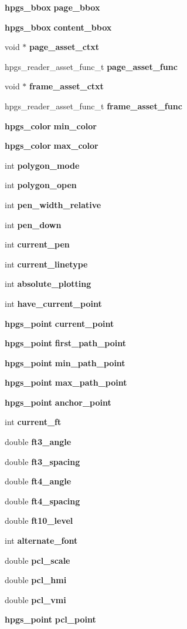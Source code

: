 \begin{CompactItemize}
{\bf hpgs\_\-bbox} {\bf page\_\-bbox}
\item 
{\bf hpgs\_\-bbox} {\bf content\_\-bbox}
\item 
void $\ast$ {\bf page\_\-asset\_\-ctxt}
\item 
hpgs\_\-reader\_\-asset\_\-func\_\-t {\bf page\_\-asset\_\-func}
\item 
void $\ast$ {\bf frame\_\-asset\_\-ctxt}
\item 
hpgs\_\-reader\_\-asset\_\-func\_\-t {\bf frame\_\-asset\_\-func}
\item 
{\bf hpgs\_\-color} {\bf min\_\-color}
\item 
{\bf hpgs\_\-color} {\bf max\_\-color}
\item 
int {\bf polygon\_\-mode}
\item 
int {\bf polygon\_\-open}
\item 
int {\bf pen\_\-width\_\-relative}
\item 
int {\bf pen\_\-down}
\item 
int {\bf current\_\-pen}
\item 
int {\bf current\_\-linetype}
\item 
int {\bf absolute\_\-plotting}
\item 
int {\bf have\_\-current\_\-point}
\item 
{\bf hpgs\_\-point} {\bf current\_\-point}
\item 
{\bf hpgs\_\-point} {\bf first\_\-path\_\-point}
\item 
{\bf hpgs\_\-point} {\bf min\_\-path\_\-point}
\item 
{\bf hpgs\_\-point} {\bf max\_\-path\_\-point}
\item 
{\bf hpgs\_\-point} {\bf anchor\_\-point}
\item 
int {\bf current\_\-ft}
\item 
double {\bf ft3\_\-angle}
\item 
double {\bf ft3\_\-spacing}
\item 
double {\bf ft4\_\-angle}
\item 
double {\bf ft4\_\-spacing}
\item 
double {\bf ft10\_\-level}
\item 
int {\bf alternate\_\-font}
\item 
double {\bf pcl\_\-scale}
\item 
double {\bf pcl\_\-hmi}
\item 
double {\bf pcl\_\-vmi}
\item 
{\bf hpgs\_\-point} {\bf pcl\_\-point}
\item 

\end{CompactItemize}
